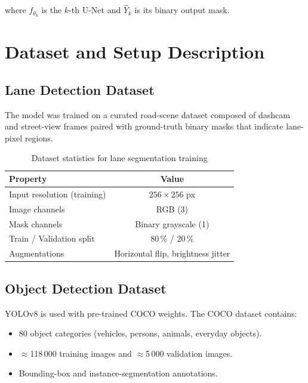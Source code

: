\documentclass[12pt, a4paper]{article}
\begin{document}
where $f_{\theta_k}$ is the $k$-th U-Net and $\hat{Y}_k$ is its binary
output mask.

\section{Dataset and Setup Description}

\subsection{Lane Detection Dataset}

The model was trained on a curated road-scene dataset composed of dashcam
and street-view frames paired with ground-truth binary masks that indicate
lane-pixel regions.

\begin{table}[H]
  \centering
  \caption{Dataset statistics for lane segmentation training}
  \begin{tabular}{lc}
    \toprule
    \textbf{Property} & \textbf{Value} \\
    \midrule
    Input resolution (training) & $256 \times 256$ px \\
    Image channels & RGB (3) \\
    Mask channels & Binary grayscale (1) \\
    Train / Validation split & 80\,\% / 20\,\% \\
    Augmentations & Horizontal flip, brightness jitter \\
    \bottomrule
  \end{tabular}
  \label{tab:dataset}
\end{table}

\subsection{Object Detection Dataset}

YOLOv8 is used with pre-trained COCO weights. The COCO dataset contains:

\begin{itemize}[noitemsep]
  \item 80 object categories (vehicles, persons, animals, everyday objects).
  \item $\approx$118\,000 training images and $\approx$5\,000 validation images.
  \item Bounding-box and instance-segmentation annotations.
\end{itemize}
\end{document}

